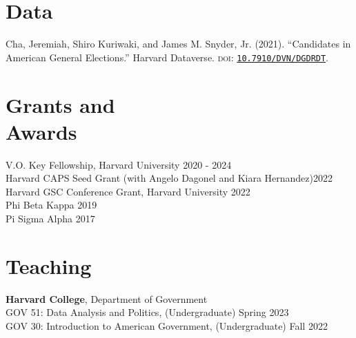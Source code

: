 \documentclass[margin, line]{res}
\begin{document}
\begin{resume}
\section{Data}
\begin{etaremune}
	\item Cha, Jeremiah, Shiro Kuriwaki, and James M. Snyder, Jr. (2021). ``Candidates in American General Elections.'' Harvard Dataverse. \textsc{doi}: \href{https://doi.org/10.7910/DVN/DGDRDT}{\texttt{10.7910/DVN/DGDRDT}}.
\end{etaremune}

\section{Grants and \\Awards}
V.O. Key Fellowship, Harvard University \hfill 2020 - 2024\\
Harvard CAPS Seed Grant (with Angelo Dagonel and Kiara Hernandez)\hfill 2022\\
Harvard GSC Conference Grant, Harvard University \hfill 2022\\
Phi Beta Kappa \hfill 2019\\
Pi Sigma Alpha \hfill 2017

\section{Teaching}
\textbf{Harvard College}, Department of Government\\
\hspace*{5mm} GOV 51: Data Analysis and Politics, (Undergraduate) \hfill Spring 2023\\
\hspace*{5mm} GOV 30: Introduction to American Government,  (Undergraduate) \hfill Fall 2022


\end{resume}
\end{document}
